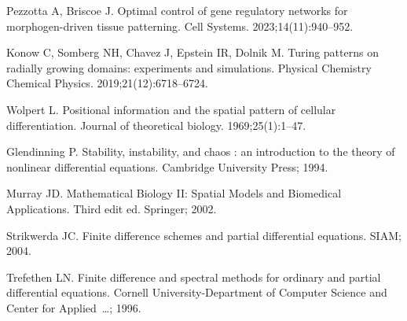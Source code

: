 \documentclass[10pt,letterpaper]{article}
\begin{document}
\begin{thebibliography}{10}
	Pezzotta A, Briscoe J.
	\newblock Optimal control of gene regulatory networks for morphogen-driven
	tissue patterning.
	\newblock Cell Systems. 2023;14(11):940--952.
	
	Konow C, Somberg NH, Chavez J, Epstein IR, Dolnik M.
	\newblock Turing patterns on radially growing domains: experiments and
	simulations.
	\newblock Physical Chemistry Chemical Physics. 2019;21(12):6718--6724.
	
	Wolpert L.
	\newblock Positional information and the spatial pattern of cellular
	differentiation.
	\newblock Journal of theoretical biology. 1969;25(1):1--47.
	
	Glendinning P.
	\newblock Stability, instability, and chaos : an introduction to the theory of
	nonlinear differential equations.
	\newblock Cambridge University Press; 1994.
	
	Murray JD.
	\newblock Mathematical Biology II: Spatial Models and Biomedical Applications.
	\newblock Third edit ed. Springer; 2002.
	
	Strikwerda JC.
	\newblock Finite difference schemes and partial differential equations.
	\newblock SIAM; 2004.
	
	Trefethen LN.
	\newblock Finite difference and spectral methods for ordinary and partial
	differential equations.
	\newblock Cornell University-Department of Computer Science and Center for
	Applied~…; 1996.

	
\end{thebibliography}
\end{document}

